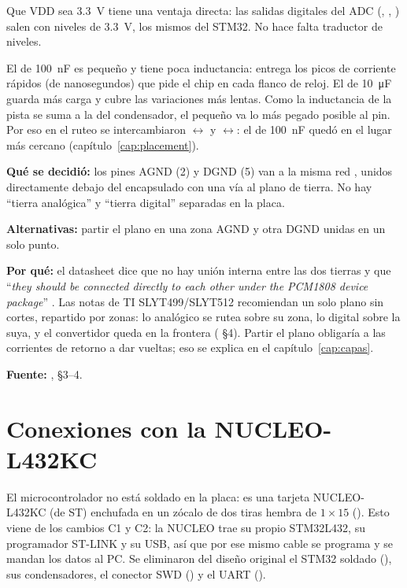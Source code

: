 Que VDD sea \SI{3.3}{\volt} tiene una ventaja directa: las salidas digitales del ADC (, , ) salen con niveles de \SI{3.3}{\volt}, los mismos del STM32. No hace falta traductor de niveles.

\begin{idea}
El de \SI{100}{\nano\farad} es pequeño y tiene poca inductancia: entrega los picos de corriente rápidos (de nanosegundos) que pide el chip en cada flanco de reloj. El de \SI{10}{\micro\farad} guarda más carga y cubre las variaciones más lentas. Como la inductancia de la pista se suma a la del condensador, el pequeño va lo más pegado posible al pin. Por eso en el ruteo se intercambiaron $\leftrightarrow$ y $\leftrightarrow$: el de \SI{100}{\nano\farad} quedó en el lugar más cercano (capítulo~\ref{cap:placement}).
\end{idea}

\begin{decision}
\textbf{Qué se decidió:} los pines AGND (2) y DGND (5) van a la misma red , unidos directamente debajo del encapsulado con una vía al plano de tierra. No hay ``tierra analógica'' y ``tierra digital'' separadas en la placa.

\textbf{Alternativas:} partir el plano en una zona AGND y otra DGND unidas en un solo punto.

\textbf{Por qué:} el datasheet dice que no hay unión interna entre las dos tierras y que ``\emph{they should be connected directly to each other under the PCM1808 device package}'' . Las notas de TI SLYT499/SLYT512 \doc{} recomiendan un solo plano sin cortes, repartido por zonas: lo analógico se rutea sobre su zona, lo digital sobre la suya, y el convertidor queda en la frontera ( §4). Partir el plano obligaría a las corrientes de retorno a dar vueltas; eso se explica en el capítulo~\ref{cap:capas}.

\textbf{Fuente:} ,  §3--4.
\end{decision}

\section{Conexiones con la NUCLEO-L432KC}\label{sec:c04-nucleo}

El microcontrolador no está soldado en la placa: es una tarjeta NUCLEO-L432KC (de ST) enchufada en un zócalo de dos tiras hembra de $1\times15$ (). Esto viene de los cambios C1 y C2: la NUCLEO trae su propio STM32L432, su programador ST-LINK y su USB, así que por ese mismo cable se programa y se mandan los datos al PC. Se eliminaron del diseño original el STM32 soldado (), sus condensadores, el conector SWD () y el UART ().


